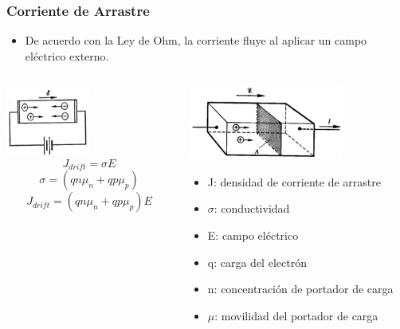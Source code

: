 \documentclass[10pt,t,aspectratio=169]{beamer}
\begin{document}
\begin{frame}[t]
    \frametitle{Corriente de Arrastre}

    \begin{itemize}
        \item De acuerdo con la Ley de Ohm, la corriente fluye al aplicar un campo eléctrico externo.
    \end{itemize}
    
    \begin{columns}
        \begin{column}{0.5\textwidth}
            \centering
            \includegraphics[width=0.5\textwidth]{./figures/drift1.png}
            \[ J_{drift} = \sigma E \]
            \[ \sigma = (qn\mu_n + qp\mu_p) \]
            \[ J_{drift} = (qn\mu_n + qp\mu_p)E \]
        \end{column}
        \begin{column}{0.5\textwidth}
            \centering
            \includegraphics[width=0.7\textwidth]{./figures/drift2.png}

            \begin{itemize}
                \item J: densidad de corriente de arrastre
                \item $\sigma$: conductividad
                \item E: campo eléctrico
                \item q: carga del electrón
                \item n: concentración de portador de carga
                \item $\mu$: movilidad del portador de carga

            \end{itemize}
        
        \end{column}
    \end{columns}

\end{frame}
\end{document}
